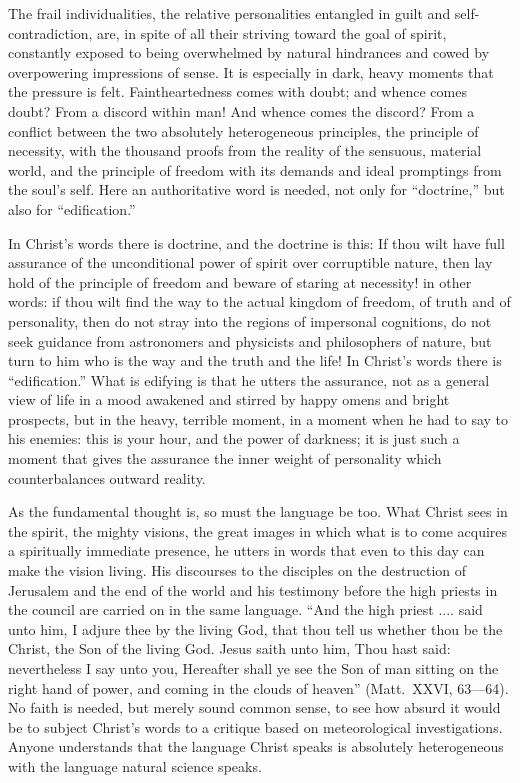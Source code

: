 \documentclass[12pt]{book}
\newcommand{\opage}[1]{\marginnote{\footnotesize\textit{[#1]}}}
\begin{document}
The frail individualities, the relative personalities entangled in guilt
and self-contradiction, are, in spite of all their striving toward the goal
of spirit, constantly exposed to being overwhelmed by natural hindrances and
cowed by overpowering impressions of sense. It is especially in dark, heavy
moments that the pressure is felt. Faintheartedness comes with doubt; and
whence comes doubt? From a discord within man! And whence comes the
discord? From a conflict between the two absolutely heterogeneous
principles, the principle of necessity, with the thousand proofs from the
reality of the sensuous, material world, and the principle of freedom with
its demands and ideal promptings from the soul's self. Here an
authoritative word is needed, not only for ``doctrine,'' but also for
``edification.''

In Christ's words there is doctrine, and the doctrine is this: If thou
wilt have full assurance of the unconditional power of spirit over
corruptible nature, then lay hold of the principle of freedom and beware of
staring at necessity! in other words: if thou wilt find the way to the
actual kingdom of freedom, of truth and of personality, then do not stray
into the regions of impersonal cognitions, do not seek guidance from
astronomers and physicists and philosophers of nature, but turn to him who
is the way and the truth and the life! In Christ's words there is
``edification.'' What is edifying is that he utters the assurance, not as a
general view of life in a mood awakened and stirred by happy omens and
bright prospects, but in the heavy, terrible moment, in a moment when
\opage{206}\setcounter{footnote}{0}%
he had to say to his enemies: this is your hour, and the power of
darkness; it is just such a moment that gives the assurance the inner
weight of personality which counterbalances outward reality.

As the fundamental thought is, so must the language be too. What Christ
sees in the spirit, the mighty visions, the great images in which what is
to come acquires a spiritually immediate presence, he utters in words that
even to this day can make the vision living. His discourses to the
disciples on the destruction of Jerusalem and the end of the world and his
testimony before the high priests in the council are carried on in the
same language. ``And the high priest .... said unto him, I adjure thee by
the living God, that thou tell us whether thou be the Christ, the Son of
the living God. Jesus saith unto him, Thou hast said: nevertheless I say
unto you, Hereafter shall ye see the Son of man sitting on the right hand
of power, and coming in the clouds of heaven'' (Matt.\ XXVI, 63---64). No
faith is needed, but merely sound common sense, to see how absurd it would
be to subject Christ's words to a critique based on meteorological
investigations. Anyone understands that the language Christ speaks is
absolutely heterogeneous with the language natural science speaks.
\end{document}
